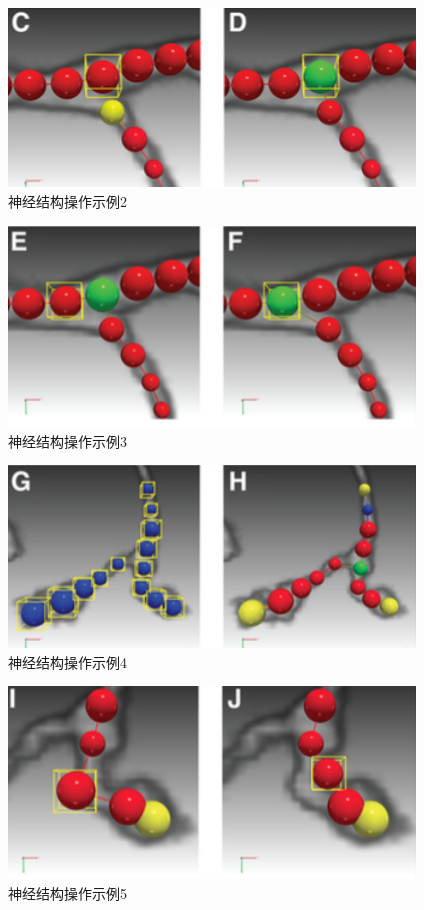 {\begin{figure}
\centering
\includegraphics[width=108mm]{images/t7}
\caption{神经结构操作示例2}
\label{fan7}
\end{figure}

\begin{figure}
\centering
\includegraphics[width=108mm]{images/t8}
\caption{神经结构操作示例3}
\label{fan8}
\end{figure}

\begin{figure}
\centering
\includegraphics[width=108mm]{images/t9}
\caption{神经结构操作示例4}
\label{fan9}
\end{figure}

\begin{figure}
\centering
\includegraphics[width=108mm]{images/t10}
\caption{神经结构操作示例5}
\label{fan10}
\end{figure}

}
